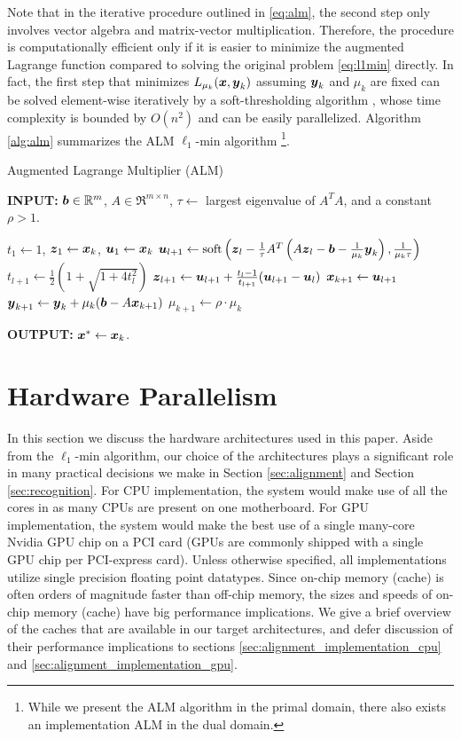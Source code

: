 \documentclass[10pt,twocolumn,letterpaper]{article}
\begin{document}
Note that in the iterative procedure outlined in \eqref{eq:alm}, the second
step only involves vector algebra and matrix-vector multiplication. Therefore,
the procedure is computationally efficient only if it is easier to minimize the
augmented Lagrange function compared to solving the original problem
\eqref{eq:l1min} directly. In fact, the first step that minimizes $L_{\mu_k}
({\boldsymbol{x}},{\boldsymbol{y}}_k)$ assuming ${\boldsymbol{y}}_k$ and $\mu_k$ are fixed can be solved element-wise
iteratively by a soft-thresholding algorithm \cite{WrightS2008,BeckA2009},
whose time complexity is bounded by $O(n^2)$ and can be easily parallelized.
Algorithm \eqref{alg:alm} summarizes the ALM $\ell_1$-min algorithm \footnote{While we
present the ALM algorithm in the primal domain, there also
exists an implementation ALM in the dual domain.}.

 \begin{algorithm}[h]
\caption{Augmented Lagrange Multiplier (ALM)}
{\bf INPUT:} ${\boldsymbol{b}} \in {\mathbb{R}}^m$, $A \in \Re^{m \times n}$, $\tau\leftarrow$ largest eigenvalue of $A^TA$, and a constant $\rho>1$.
\begin{algorithmic}[1]
 \STATE $t_1 \leftarrow 1$, ${\boldsymbol{z}}_1
\leftarrow {\boldsymbol{x}}_k$, ${\boldsymbol{u}}_1 \leftarrow {\boldsymbol{x}}_k$  \STATE ${\boldsymbol{u}}_{l+1}  \leftarrow
\mathrm{soft}\left({\boldsymbol{z}}_l - \frac{1}{\tau}A^T\left(A{\boldsymbol{z}}_l - {\boldsymbol{b}}
- \frac{1}{\mu_k}{\boldsymbol{y}}_k\right), \frac{1}{\mu_k\tau}\right)$
\STATE $t_{l+1} \leftarrow \frac{1}{2}\left( 1 +
\sqrt{1+4t_l^2}\right)$ \STATE ${\boldsymbol{z}}_{l+1} \leftarrow {\boldsymbol{u}}_{l+1}
+ \frac{t_l - 1}{t_{l+1}}({\boldsymbol{u}}_{l+1} - {\boldsymbol{u}}_l)$ \ENDWHILE \STATE$
{\boldsymbol{x}}_{k+1} \leftarrow {\boldsymbol{u}}_{l+1}$ \STATE ${\boldsymbol{y}}_{k+1} \leftarrow
{\boldsymbol{y}}_k + \mu_k ({\boldsymbol{b}} - A{\boldsymbol{x}}_{k+1})$ \STATE $\mu_{k+1} \leftarrow
\rho\cdot\mu_k$ \ENDWHILE 
\end{algorithmic}

{\bf OUTPUT:} ${\boldsymbol{x}}^* \leftarrow {\boldsymbol{x}}_k$.
\label{alg:alm}
\end{algorithm}

\section{Hardware Parallelism} \label{sec:parallelism} 
In this section we discuss the hardware architectures used in this paper. Aside
from the $\ell_1$-min algorithm, our choice of the architectures plays a
significant role in many practical decisions we make in Section
\ref{sec:alignment} and Section \ref{sec:recognition}.  For CPU implementation,
the system would make use of all the cores in as many CPUs are present on one
motherboard.  For GPU implementation, the system would make the best use of a
single many-core Nvidia GPU chip  on a PCI card (GPUs are commonly shipped with
a single GPU chip per PCI-express card).  Unless otherwise specified, all
implementations utilize single precision floating point datatypes.  Since on-chip
memory (cache) is often orders of magnitude faster than off-chip memory, the sizes
and speeds of on-chip memory (cache) have big performance implications.  We give
a brief overview of the caches that are available in our target architectures,
and defer discussion of their performance implications to sections
\ref{sec:alignment_implementation_cpu} and
\ref{sec:alignment_implementation_gpu}.
\end{document}
